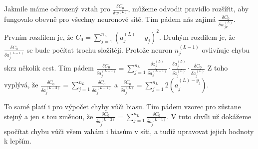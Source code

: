 Jakmile máme odvozený vztah pro \(\frac{\delta C_0}{\delta w^{(L)}}\), můžeme odvodit pravidlo rozšířit, aby fungovalo obevně pro všechny neuronové sítě.
Tím pádem nás zajímá \(\frac{\delta C_0}{\delta w_{jk}^{(L)}}\). Prvním rozdílem je, že \(C_0 = \sum_{j=1}^{n_L}(a_j^{(L)} - y_j)^2 \).
Druhým rozdílem je, že \(\frac{\delta C_0}{\delta a_j^{(L-1)}}\) se bude počítat trochu složitěji. Protože neuron \(n_j^{(L-1)}\) ovlivňuje chybu skrz několik cest.
Tím pádem \(\frac{\delta C_0}{\delta a_j^{(L-1)}} = \sum_{j=1}^{n_L} \frac{\delta z_j^{(L)}}{\delta a_k^{(L-1)}} \cdot \frac{\delta a_j^{(L)}}{\delta z_j^{(L)}} \cdot \frac{\delta C_0}{\delta a_j^(L)}\)
Z toho vyplývá, že \(\frac{\delta C_0}{\delta a_j^{(L-2)}} = \sum_{j=1}^{n_L} \frac{\delta C_0}{\delta a_j^{(L-1)}} \) a \(\frac{\delta C_0}{\delta a_j^{(L)}} = \sum_{j=1}^{n_L} 2(a_j^{(L) - y_j})\).

To samé platí i pro výpočet chyby vůči biasu. Tím pádem vzorec pro zůstane stejný a jen s tou změnou, že \(\frac{\delta C_0}{\delta a_j^{(L-2)}} = \sum_{j=1}^{n_L} \frac{\delta C_0}{\delta a_j^{(L-1)}} \).
V tuto chvíli už dokážeme spočítat chybu vůči všem vahám i biasům v síti, a tudíž upravovat jejich hodnoty k lepším.